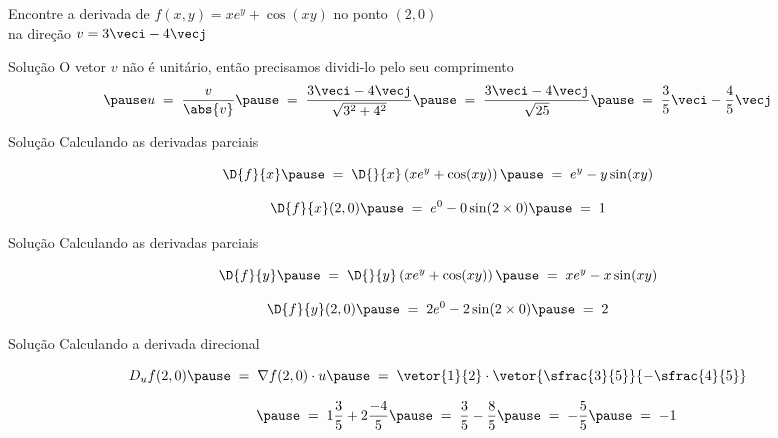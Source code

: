 \begin{question}
  Encontre a derivada de \(f(x, y) = xe^y + \cos(xy)\)
  no ponto \((2, 0)\) \\
  na direção \(v=3\veci-4\vecj\)
\end{question}

\begin{resolution}{Solução}
  O vetor $v$ não é unitário,
  \pause
  então precisamos dividi-lo pelo seu
  comprimento
  \[
    \pause
    u
    \;=\; \frac{v}{\abs{v}}
    \pause
    \;=\; \frac{3\veci-4\vecj}{\sqrt{3^2+4^2}}
    \pause
    \;=\; \frac{3\veci-4\vecj}{\sqrt{25}}
    \pause
    \;=\; \frac{3}{5}\veci - \frac{4}{5}\vecj
  \]
\end{resolution}

\begin{resolution}{Solução}
  Calculando as derivadas parciais

  \pause
  \[
    \D{f}{x}
    \pause
    \;=\;  \D{}{x}\left(xe^y + \cos(xy)\right)
    \pause
    \;=\;  e^y - y\sin(xy)
  \]

  \pause
  \[
    \D{f}{x}(2, 0)
    \pause
    \;=\;  e^0 - 0\sin(2\times 0)
    \pause
    \;=\;  1
  \]
\end{resolution}

\begin{resolution}{Solução}
  Calculando as derivadas parciais

  \pause
  \[
    \D{f}{y}
    \pause
    \;=\;  \D{}{y}\left(xe^y + \cos(xy)\right)
    \pause
    \;=\;  xe^y - x\sin(xy)
  \]

  \pause
  \[
    \D{f}{y}(2, 0)
    \pause
    \;=\;  2e^0 - 2\sin(2\times 0)
    \pause
    \;=\;  2
  \]
\end{resolution}

\begin{resolution}{Solução}
  Calculando a derivada direcional

  \[
    D_u f(2, 0)
    \pause
    \;=\; \nabla f(2, 0) \cdot u
    \pause
    \;=\; \vetor{1}{2} \cdot \vetor{\sfrac{3}{5}}{-\sfrac{4}{5}}
  \]

  \[
    \hphantom{D_u f(2, 0){}}
    \pause
    \;=\; 1 \frac{3}{5} + 2 \frac{-4}{5}
    \pause
    \;=\; \frac{3}{5} - \frac{8}{5}
    \pause
    \;=\; - \frac{5}{5}
    \pause
    \;=\; -1
  \]
\end{resolution}

